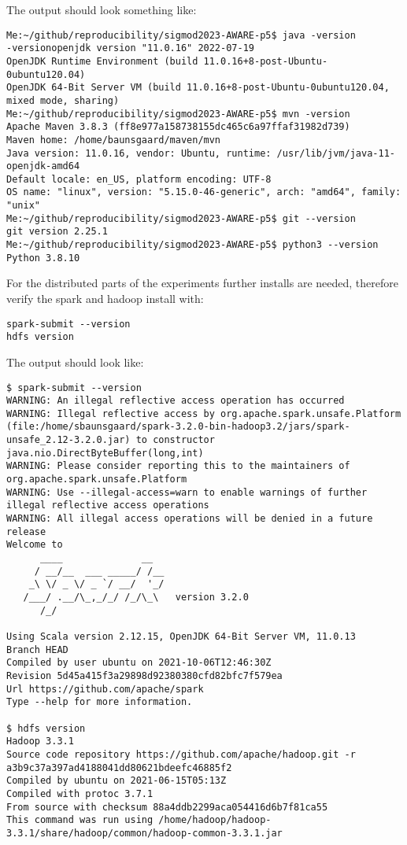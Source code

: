 \documentclass{readme}
\begin{document}
\noindent
The output should look something like:

\begin{lstlisting}
Me:~/github/reproducibility/sigmod2023-AWARE-p5$ java -version
-versionopenjdk version "11.0.16" 2022-07-19
OpenJDK Runtime Environment (build 11.0.16+8-post-Ubuntu-0ubuntu120.04)
OpenJDK 64-Bit Server VM (build 11.0.16+8-post-Ubuntu-0ubuntu120.04, mixed mode, sharing)
Me:~/github/reproducibility/sigmod2023-AWARE-p5$ mvn -version
Apache Maven 3.8.3 (ff8e977a158738155dc465c6a97ffaf31982d739)
Maven home: /home/baunsgaard/maven/mvn
Java version: 11.0.16, vendor: Ubuntu, runtime: /usr/lib/jvm/java-11-openjdk-amd64
Default locale: en_US, platform encoding: UTF-8
OS name: "linux", version: "5.15.0-46-generic", arch: "amd64", family: "unix"
Me:~/github/reproducibility/sigmod2023-AWARE-p5$ git --version
git version 2.25.1
Me:~/github/reproducibility/sigmod2023-AWARE-p5$ python3 --version
Python 3.8.10
\end{lstlisting}

\noindent
For the distributed parts of the experiments further installs are needed,
therefore verify the spark and hadoop install with:

\begin{lstlisting}
spark-submit --version
hdfs version
\end{lstlisting}

\noindent
The output should look like:

\begin{lstlisting}
$ spark-submit --version
WARNING: An illegal reflective access operation has occurred
WARNING: Illegal reflective access by org.apache.spark.unsafe.Platform (file:/home/sbaunsgaard/spark-3.2.0-bin-hadoop3.2/jars/spark-unsafe_2.12-3.2.0.jar) to constructor java.nio.DirectByteBuffer(long,int)
WARNING: Please consider reporting this to the maintainers of org.apache.spark.unsafe.Platform
WARNING: Use --illegal-access=warn to enable warnings of further illegal reflective access operations
WARNING: All illegal access operations will be denied in a future release
Welcome to
      ____              __
     / __/__  ___ _____/ /__
    _\ \/ _ \/ _ `/ __/  '_/
   /___/ .__/\_,_/_/ /_/\_\   version 3.2.0
      /_/
                        
Using Scala version 2.12.15, OpenJDK 64-Bit Server VM, 11.0.13
Branch HEAD
Compiled by user ubuntu on 2021-10-06T12:46:30Z
Revision 5d45a415f3a29898d92380380cfd82bfc7f579ea
Url https://github.com/apache/spark
Type --help for more information.

$ hdfs version
Hadoop 3.3.1
Source code repository https://github.com/apache/hadoop.git -r a3b9c37a397ad4188041dd80621bdeefc46885f2
Compiled by ubuntu on 2021-06-15T05:13Z
Compiled with protoc 3.7.1
From source with checksum 88a4ddb2299aca054416d6b7f81ca55
This command was run using /home/hadoop/hadoop-3.3.1/share/hadoop/common/hadoop-common-3.3.1.jar
\end{lstlisting}
\end{document}
